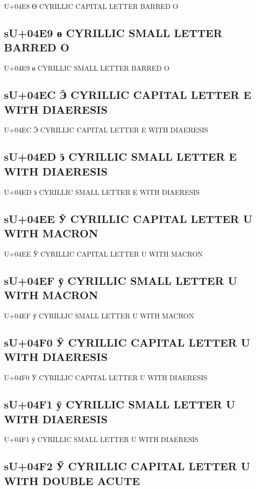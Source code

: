U+04E8 Ө  CYRILLIC CAPITAL LETTER BARRED O

\subsection{sU+04E9 ө  CYRILLIC SMALL LETTER BARRED O}

U+04E9 ө  CYRILLIC SMALL LETTER BARRED O

\subsection{sU+04EC Ӭ  CYRILLIC CAPITAL LETTER E WITH DIAERESIS}

U+04EC Ӭ  CYRILLIC CAPITAL LETTER E WITH DIAERESIS

\subsection{sU+04ED ӭ  CYRILLIC SMALL LETTER E WITH DIAERESIS}

U+04ED ӭ  CYRILLIC SMALL LETTER E WITH DIAERESIS

\subsection{sU+04EE Ӯ  CYRILLIC CAPITAL LETTER U WITH MACRON}

U+04EE Ӯ  CYRILLIC CAPITAL LETTER U WITH MACRON

\subsection{sU+04EF ӯ  CYRILLIC SMALL LETTER U WITH MACRON}

U+04EF ӯ  CYRILLIC SMALL LETTER U WITH MACRON

\subsection{sU+04F0 Ӱ  CYRILLIC CAPITAL LETTER U WITH DIAERESIS}

U+04F0 Ӱ  CYRILLIC CAPITAL LETTER U WITH DIAERESIS

\subsection{sU+04F1 ӱ  CYRILLIC SMALL LETTER U WITH DIAERESIS}

U+04F1 ӱ  CYRILLIC SMALL LETTER U WITH DIAERESIS

\subsection{sU+04F2 Ӳ  CYRILLIC CAPITAL LETTER U WITH DOUBLE ACUTE}

